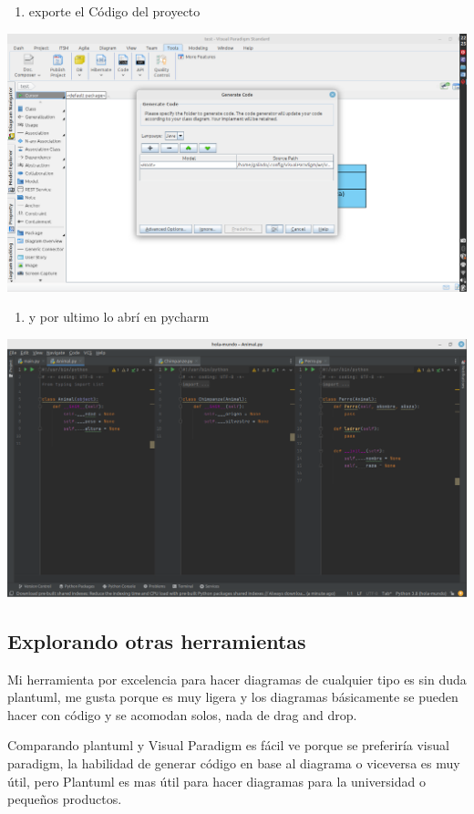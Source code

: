 \documentclass[12pt]{article}
\begin{document}
\begin{enumerate}
\item exporte el Código del proyecto
\end{enumerate}
\begin{center}
\includegraphics[width=.9\linewidth]{./img/3.png}
\end{center}

\begin{enumerate}
\item y por ultimo lo abrí en pycharm
\end{enumerate}
\begin{center}
\includegraphics[width=.9\linewidth]{./img/4.png}
\end{center}

\subsection*{Explorando otras herramientas}
\label{sec:orgabaec45}
Mi herramienta por excelencia para hacer diagramas de cualquier tipo es sin duda plantuml, me gusta porque es muy ligera y los diagramas básicamente se pueden hacer con código y se acomodan solos, nada de drag and drop.

Comparando plantuml y Visual Paradigm es fácil ve porque se preferiría visual paradigm, la habilidad de generar código en base al diagrama o viceversa es muy útil, pero Plantuml es mas útil para hacer diagramas para la universidad o pequeños productos.
\end{document}
